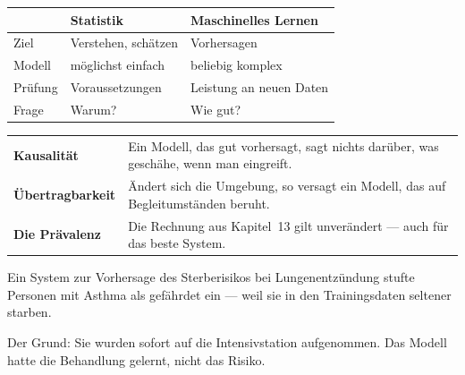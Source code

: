 \begin{merksatz}
\begin{center}
{\small
\renewcommand{\arraystretch}{1.52}
\begin{tabular}{@{}P{2.0cm}P{3.2cm}P{3.0cm}@{}}
\toprule
& \textbf{Statistik} & \textbf{Maschinelles Lernen}\\
\midrule
Ziel & Verstehen, schätzen & Vorhersagen\\
Modell & möglichst einfach & beliebig komplex\\
Prüfung & Voraussetzungen & Leistung an neuen Daten\\
Frage & Warum? & Wie gut?\\
\bottomrule
\end{tabular}}
\end{center}

\begin{center}
\begin{minipage}{0.88\textwidth}
\end{minipage}
\end{center}
\end{merksatz}

\begin{warnung}
\begin{center}
\renewcommand{\arraystretch}{1.5}
\begin{tabular}{@{}P{3.0cm}P{5.6cm}@{}}
\toprule
\textbf{Kausalität} & Ein Modell, das gut vorhersagt, sagt nichts darüber, was geschähe, wenn man eingreift.\\
\textbf{Übertrag\-barkeit} & Ändert sich die Umgebung, so versagt ein Modell, das auf Begleitumständen beruht.\\
\textbf{Die Prävalenz} & Die Rechnung aus Kapitel~13 gilt unverändert --- auch für das beste System.\\
\bottomrule
\end{tabular}
\end{center}

Ein System zur Vorhersage des Sterberisikos bei Lungenentzündung stufte Personen mit Asthma als  gefährdet ein --- weil sie in den Trainingsdaten seltener starben.

Der Grund: Sie wurden sofort auf die Intensivstation aufgenommen. Das Modell hatte die Behandlung gelernt, nicht das Risiko.

\begin{center}
\begin{minipage}{0.88\textwidth}
\end{minipage}
\end{center}
\end{warnung}

